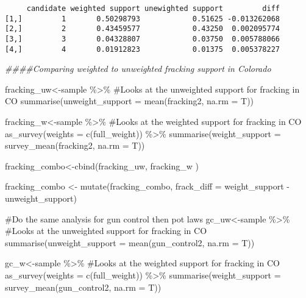 \documentclass[
  letterpaper,
  DIV=11,
  numbers=noendperiod]{scrreprt}
\newenvironment{Shaded}{\begin{snugshade}}{\end{snugshade}}
\newcommand{\AttributeTok}[1]{\textcolor[rgb]{0.40,0.45,0.13}{#1}}
\newcommand{\CommentTok}[1]{\textcolor[rgb]{0.37,0.37,0.37}{#1}}
\newcommand{\DocumentationTok}[1]{\textcolor[rgb]{0.37,0.37,0.37}{\textit{#1}}}
\newcommand{\FunctionTok}[1]{\textcolor[rgb]{0.28,0.35,0.67}{#1}}
\newcommand{\NormalTok}[1]{\textcolor[rgb]{0.00,0.23,0.31}{#1}}
\newcommand{\OtherTok}[1]{\textcolor[rgb]{0.00,0.23,0.31}{#1}}
\newcommand{\SpecialCharTok}[1]{\textcolor[rgb]{0.37,0.37,0.37}{#1}}
\begin{document}
\begin{verbatim}
     candidate weighted support unewighted support         diff
[1,]         1       0.50298793            0.51625 -0.013262068
[2,]         2       0.43459577            0.43250  0.002095774
[3,]         3       0.04328807            0.03750  0.005788066
[4,]         4       0.01912823            0.01375  0.005378227
\end{verbatim}

\begin{Shaded}
\begin{Highlighting}[]
\DocumentationTok{\#\#\#\#Comparing weighted to unweighted fracking support in Colorado }

\NormalTok{fracking\_uw}\OtherTok{\textless{}{-}}\NormalTok{sample }\SpecialCharTok{\%\textgreater{}\%} \CommentTok{\#Looks at the unweighted support for fracking in CO}
  \FunctionTok{summarise}\NormalTok{(}\AttributeTok{unweight\_support =} \FunctionTok{mean}\NormalTok{(fracking2, }\AttributeTok{na.rm =}\NormalTok{ T))}

\NormalTok{fracking\_w}\OtherTok{\textless{}{-}}\NormalTok{sample }\SpecialCharTok{\%\textgreater{}\%} \CommentTok{\#Looks at the weighted support for fracking in CO}
  \FunctionTok{as\_survey}\NormalTok{(}\AttributeTok{weights =} \FunctionTok{c}\NormalTok{(full\_weight)) }\SpecialCharTok{\%\textgreater{}\%}
   \FunctionTok{summarise}\NormalTok{(}\AttributeTok{weight\_support =} \FunctionTok{survey\_mean}\NormalTok{(fracking2, }\AttributeTok{na.rm =}\NormalTok{ T))}


\NormalTok{fracking\_combo}\OtherTok{\textless{}{-}}\FunctionTok{cbind}\NormalTok{(fracking\_uw, fracking\_w ) }

\NormalTok{fracking\_combo }\OtherTok{\textless{}{-}} \FunctionTok{mutate}\NormalTok{(fracking\_combo, }\AttributeTok{frack\_diff =}\NormalTok{ weight\_support }\SpecialCharTok{{-}}\NormalTok{ unweight\_support)}

\CommentTok{\#Do the same analysis for gun control then pot laws}
\NormalTok{gc\_uw}\OtherTok{\textless{}{-}}\NormalTok{sample }\SpecialCharTok{\%\textgreater{}\%} \CommentTok{\#Looks at the unweighted support for fracking in CO}
  \FunctionTok{summarise}\NormalTok{(}\AttributeTok{unweight\_support =} \FunctionTok{mean}\NormalTok{(gun\_control2, }\AttributeTok{na.rm =}\NormalTok{ T))}

\NormalTok{gc\_w}\OtherTok{\textless{}{-}}\NormalTok{sample }\SpecialCharTok{\%\textgreater{}\%} \CommentTok{\#Looks at the weighted support for fracking in CO}
  \FunctionTok{as\_survey}\NormalTok{(}\AttributeTok{weights =} \FunctionTok{c}\NormalTok{(full\_weight)) }\SpecialCharTok{\%\textgreater{}\%}
   \FunctionTok{summarise}\NormalTok{(}\AttributeTok{weight\_support =} \FunctionTok{survey\_mean}\NormalTok{(gun\_control2, }\AttributeTok{na.rm =}\NormalTok{ T))}



\end{Highlighting}
\end{Shaded}
\end{document}
